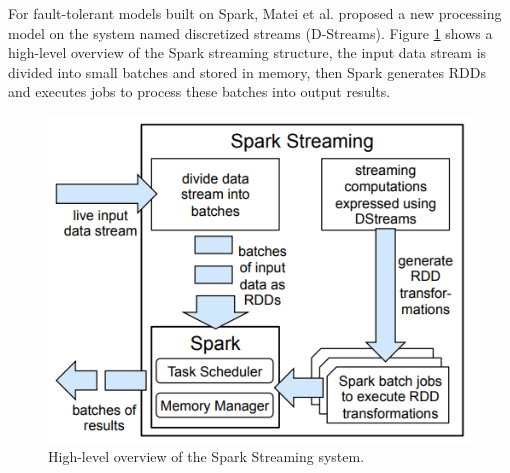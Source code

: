 \documentclass[11pt,twocolumn]{article}
\begin{document}
For fault-tolerant models built on Spark, Matei et al. proposed a new processing model on the system named discretized streams (D-Streams)\cite{Zaharia:2013:DSF:2517349.2522737,zaharia2012discretized}. Figure \ref{fig:sparkstreaming} shows a high-level overview of the Spark streaming structure, the input data stream is divided into small batches and stored in memory, then Spark generates RDDs and executes jobs to process these batches into output results.
\begin{figure}[ht]
    \centering
        \includegraphics[width=\linewidth]{sparkstreaming}
        \caption{High-level overview of the Spark Streaming system\cite{Zaharia:2013:DSF:2517349.2522737}.}
        \label{fig:sparkstreaming}
\end{figure}
\end{document}

